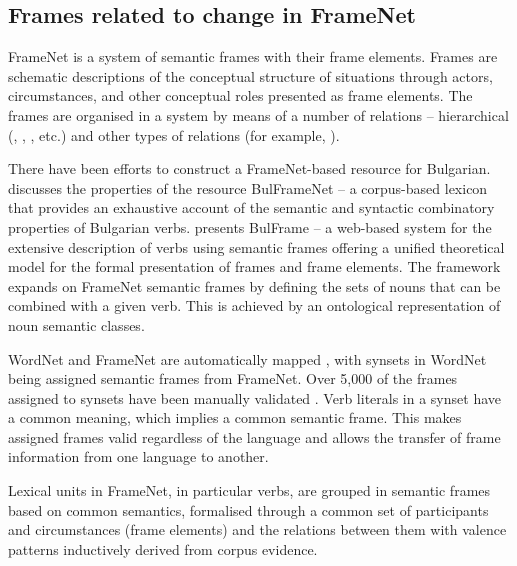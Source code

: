 \documentclass[output=paper,colorlinks,citecolor=brown]{langscibook}
\begin{document}
\subsection{Frames related to change in FrameNet}

FrameNet \citep{Baker1998} is a system of semantic frames with their frame elements. Frames are schematic descriptions of the conceptual structure of situations through actors, circumstances, and other conceptual roles presented as frame elements. The frames are organised in a system by means of a number of relations -- hierarchical (, , , etc.) and other types of relations (for example, ).


There have been efforts to construct a FrameNet-based resource for Bulgarian. \citet{Koeva2010-framenet} discusses the properties of the resource BulFrameNet -- a corpus-based lexicon that provides an exhaustive account of the semantic and syntactic combinatory properties of Bulgarian verbs. \citet{KoevaDoychev:2022} presents BulFrame -- a web-based system for the extensive description of verbs using semantic frames offering a unified theoretical model for the formal presentation of frames and frame elements. The framework expands on FrameNet semantic frames by defining the sets of nouns that can be combined with a given verb. This is achieved by an ontological representation of noun semantic classes.


WordNet and FrameNet are automatically mapped \citep{LesevaStoyanova2020}, with synsets in WordNet being assigned semantic frames from FrameNet. Over 5,000 of the frames assigned to synsets have been manually validated \citep{LesevaStoyanova2020}. Verb literals in a synset have a common meaning, which implies a common semantic frame. This makes assigned frames valid regardless of the language and allows the transfer of frame information from one language to another. 

Lexical units in FrameNet, in particular verbs, are grouped in semantic frames based on common semantics, formalised through a common set of participants and circumstances (frame elements) and the relations between them \citep{Fillmore1982,Fillmore1985,Fillmore2003,FillmoreBaker2009,Ruppenhofer2016} with valence patterns inductively derived from corpus evidence. 
\end{document}
